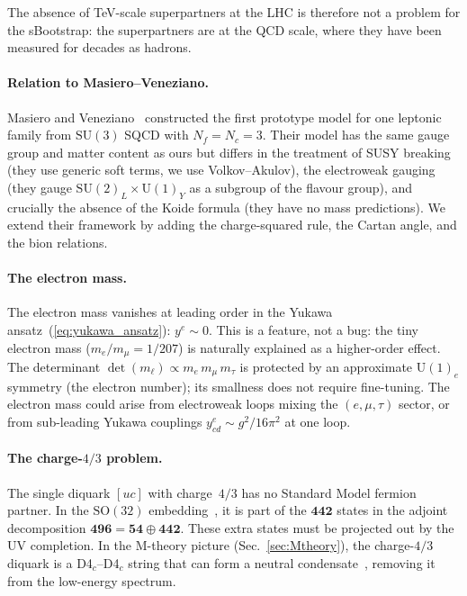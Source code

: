 \documentclass[aps,prd,twocolumn,showpacs,preprintnumbers,superscriptaddress]{revtex4-2}
\newcommand{\SU}{\mathrm{SU}}
\newcommand{\UU}{\mathrm{U}}
\newcommand{\SO}{\mathrm{SO}}
\newcommand{\Nc}{N_c}
\newcommand{\Nf}{N_f}
\begin{document}
The absence of TeV-scale superpartners at the LHC is
therefore not a problem for the sBootstrap: the superpartners
are at the QCD scale, where they have been measured for
decades as hadrons.

\paragraph{Relation to Masiero--Veneziano.}

Masiero and Veneziano~\cite{MasieroVeneziano:1985} constructed
the first prototype model for one leptonic family from
$\SU(3)$ SQCD with $\Nf = \Nc = 3$.
Their model has the same gauge group and matter content as
ours but differs in the treatment of SUSY breaking (they use
generic soft terms, we use Volkov--Akulov), the electroweak
gauging (they gauge $\SU(2)_L \times \UU(1)_Y$ as a subgroup
of the flavour group), and crucially the absence of the Koide
formula (they have no mass predictions).
We extend their framework by adding the charge-squared rule,
the Cartan angle, and the bion relations.

\paragraph{The electron mass.}

The electron mass vanishes at leading order in the Yukawa
ansatz~(\ref{eq:yukawa_ansatz}): $y^e \sim 0$.
This is a feature, not a bug: the tiny electron mass
($m_e/m_\mu = 1/207$) is naturally explained as a higher-order
effect.
The determinant $\det(m_\ell) \propto m_e\,m_\mu\,m_\tau$
is protected by an approximate $\UU(1)_e$ symmetry (the
electron number); its smallness does not require fine-tuning.
The electron mass could arise from electroweak loops mixing
the $(e, \mu, \tau)$ sector, or from sub-leading Yukawa
couplings $y^e_{cd} \sim g^2/16\pi^2$ at one loop.

\paragraph{The charge-$4/3$ problem.}

The single diquark $[uc]$ with charge~$4/3$ has no Standard
Model fermion partner.
In the $\SO(32)$ embedding~\cite{Rivero:2024}, it is part of
the $\mathbf{442}$ states in the adjoint decomposition
$\mathbf{496} = \mathbf{54} \oplus \mathbf{442}$.
These extra states must be projected out by the UV completion.
In the M-theory picture (Sec.~\ref{sec:Mtheory}), the
charge-$4/3$ diquark is a D4$_c$--D4$_c$ string that can form
a neutral condensate~\cite{v159}, removing it from the
low-energy spectrum.
\end{document}
